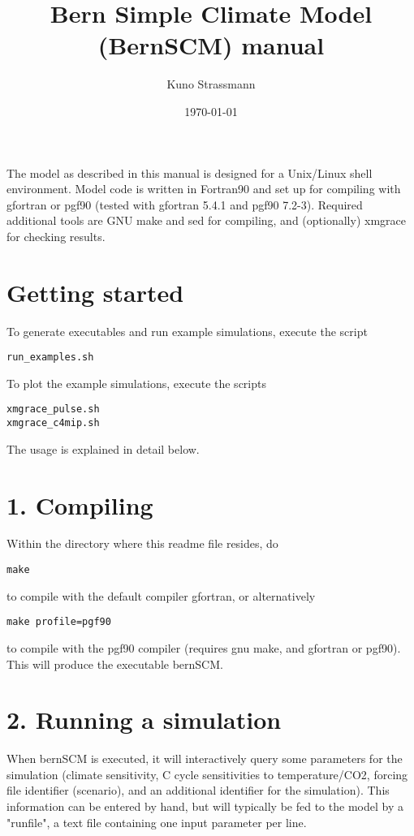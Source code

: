 \documentclass[11pt]{article}
\author{Kuno Strassmann}
\date{\today}
\title{Bern Simple Climate Model (BernSCM) manual}
\begin{document}
\maketitle

\noindent
The model as described in this manual is designed for a Unix/Linux shell environment. Model code is written in Fortran90 and set up for compiling with gfortran or pgf90 (tested with gfortran 5.4.1 and pgf90 7.2-3). Required additional tools are GNU make and sed for compiling, and (optionally) \mbox{xmgrace} for checking results.

\section*{Getting started}
\label{sec-1}

To generate executables and run example simulations, execute the script 
\begin{verbatim}
run_examples.sh
\end{verbatim}
To plot the example simulations, execute the scripts
\begin{verbatim}
xmgrace_pulse.sh
xmgrace_c4mip.sh
\end{verbatim}

The usage is explained in detail below.

\section*{1. Compiling}
\label{sec-2}

Within the directory where this readme file resides, do

\begin{verbatim}
make
\end{verbatim}

to compile with the default compiler gfortran, or alternatively

\begin{verbatim}
make profile=pgf90
\end{verbatim}

to compile with the pgf90 compiler (requires gnu make, and gfortran or pgf90).
This will produce the executable bernSCM.


\section*{2. Running a simulation}
\label{sec-3}

When bernSCM is executed, it will interactively query some parameters for the simulation (climate sensitivity, C cycle sensitivities to temperature/CO2, forcing file identifier (scenario), and an additional identifier for the simulation). This information can be entered by hand, but will typically be fed to the model by a "runfile", a text file containing one input parameter per line.
\end{document}
